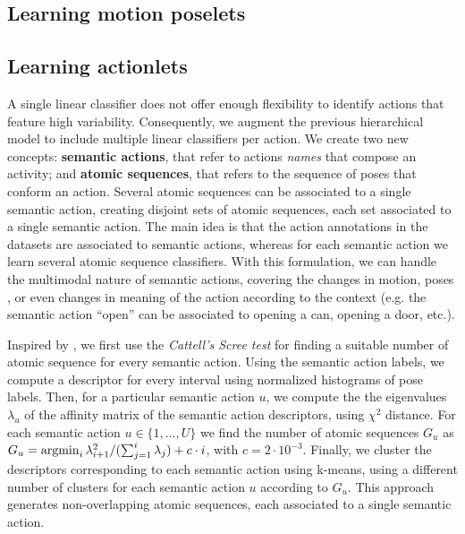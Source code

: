 

\subsection{Learning motion poselets}

\subsection{Learning actionlets}
A single linear classifier does not offer enough flexibility to identify 
actions that feature high variability. Consequently, we augment the previous 
hierarchical model to include multiple linear classifiers per action. We create 
two new concepts: \textbf{semantic actions}, that refer to actions \emph{names} 
that compose an activity; and \textbf{atomic sequences}, that refers to the 
sequence of poses that conform an action. Several atomic sequences can be 
associated to a single semantic action, creating disjoint sets of atomic 
sequences, each set associated to a single semantic action.  The main idea is 
that the action annotations in the datasets are associated to semantic actions, 
whereas for each semantic action we learn several atomic sequence classifiers. 
With this formulation, we can handle the multimodal nature of semantic actions, 
covering the changes in motion, poses , or even changes in meaning of the action 
according to the context (e.g. the semantic action ``open'' can be associated to 
opening a can, opening a door, etc.). 

Inspired by \cite{Raptis2012}, we first use the \emph{Cattell's Scree test} for 
finding a suitable number of atomic sequence for every semantic action. Using 
the semantic action labels, we compute a descriptor for every interval using 
normalized histograms of pose labels. Then, for a particular semantic action 
$u$, we compute the the eigenvalues $\lambda_u$ of the affinity matrix of the 
semantic action descriptors, using $\chi^2$ distance. For each semantic action 
$u \in \{1,\dots,U\}$ we find the number of atomic sequences $G_u$ as $G_u = 
\operatorname*{argmin}_i \lambda_{i+1}^2 / (\sum_{j=1}^i \lambda_j) + c\cdot i$, with $c=2\cdot 
10^{-3}$. Finally, we cluster the descriptors corresponding to each semantic 
action using k-means, using a different number of clusters for each semantic 
action $u$ according to $G_u$. This approach generates non-overlapping atomic 
sequences, each associated to a single semantic action.

